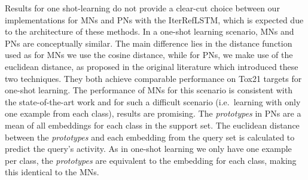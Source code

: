 Results for one shot-learning do not provide a clear-cut choice between our implementations for MNs and PNs with the IterRefLSTM, which is expected due to the architecture of these methods.  In a one-shot learning scenario, MNs and PNs are conceptually similar. The main difference lies in the distance function used as for MNs we use the cosine distance, while for PNs, we make use of the euclidean distance, as proposed in the original literature which introduced these two techniques. They both achieve comparable performance on Tox21 targets for one-shot learning. The performance of MNs for this scenario is consistent with the state-of-the-art work and for such a difficult scenario (i.e.\ learning with only one example from each class), results are promising. The \textit{prototypes} in PNs are a mean of all embeddings for each class in the support set. The euclidean distance between the \textit{prototypes} and each embedding from the query set is calculated to predict the query's activity. As in one-shot learning we only have one example per class, the \textit{prototypes} are equivalent to the embedding for each class, making this identical to the MNs. 

